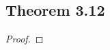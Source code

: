 \documentclass[../../main.tex]{subfiles}
\begin{document}
\subsection{Theorem 3.12}
\begin{wts}

\end{wts}
\begin{proof}

\end{proof}
\end{document}
